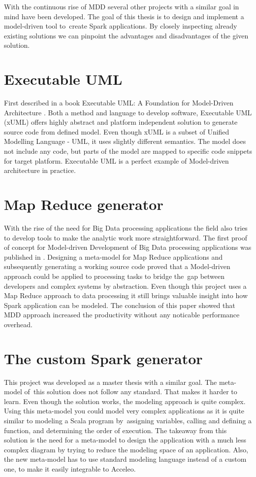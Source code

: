 With the continuous rise of MDD several other projects with a similar goal in mind have been developed. The goal of this thesis is to design and implement a model-driven tool to~create Spark applications. By closely inspecting already existing solutions we can pinpoint the advantages and disadvantages of the given solution. 



\section{Executable UML}

First described in a book Executable UML: A Foundation for Model-Driven Architecture \cite{xuml}. Both a method and language to develop software, Executable UML (xUML) offers highly abstract and platform independent solution to generate source code from defined model. Even though xUML is a subset of Unified Modelling Language - UML, it uses slightly different semantics. The model does not include any code, but parts of the model are mapped to specific code snippets for target platform. Executable UML is a perfect example of Model-driven architecture in practice. 

\section{Map Reduce generator}

With the rise of the need for Big Data processing applications the field also tries to develop tools to make the analytic work more straightforward. The first proof of concept for Model-driven Development of Big Data processing applications was published in \cite{mdd-mapreduce}. Designing a meta-model for Map Reduce applications and subsequently generating a working source code proved that a Model-driven approach could be applied to processing tasks to bridge the~gap between developers and complex systems by abstraction. Even though this project uses a Map Reduce approach to data processing it still brings valuable insight into how Spark application can be modeled. The conclusion of this paper showed that MDD approach increased the productivity without any noticable performance overhead. 


\section{The custom Spark generator}

This project was developed as a master thesis \cite{dip-mddspark} with a similar goal. The meta-model of~this solution does not follow any standard. That makes it harder to learn. Even though the solution works, the modeling approach is quite complex. Using this meta-model you could model very complex applications as it is quite similar to modeling a Scala program by~assigning variables, calling and defining a function, and determining the order of execution.
The takeaway from this solution is the need for a meta-model to design the application with a much less complex diagram by trying to reduce the modeling space of an application. Also, the new meta-model has to use standard modeling language instead of a custom one, to make it easily integrable to Acceleo. 

